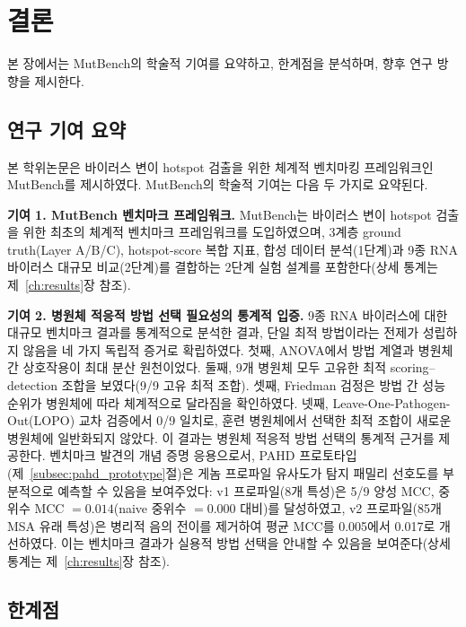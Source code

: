 \chapter{결론}
\label{ch:conclusion}

본 장에서는 MutBench의 학술적 기여를 요약하고, 한계점을 분석하며, 향후 연구 방향을 제시한다.

\section{연구 기여 요약}
\label{sec:contribution_summary}

본 학위논문은 바이러스 변이 hotspot 검출을 위한 체계적 벤치마킹 프레임워크인 MutBench를 제시하였다.
MutBench의 학술적 기여는 다음 두 가지로 요약된다.

\textbf{기여 1. MutBench 벤치마크 프레임워크.}
MutBench는 바이러스 변이 hotspot 검출을 위한 최초의 체계적 벤치마크 프레임워크를 도입하였으며, 3계층 ground truth(Layer A/B/C), hotspot-score 복합 지표, 합성 데이터 분석(1단계)과 9종 RNA 바이러스 대규모 비교(2단계)를 결합하는 2단계 실험 설계를 포함한다(상세 통계는 제~\ref{ch:results}장 참조).

\textbf{기여 2. 병원체 적응적 방법 선택 필요성의 통계적 입증.}
9종 RNA 바이러스에 대한 대규모 벤치마크 결과를 통계적으로 분석한 결과, 단일 최적 방법이라는 전제가 성립하지 않음을 네 가지 독립적 증거로 확립하였다.
첫째, ANOVA에서 방법 계열과 병원체 간 상호작용이 최대 분산 원천이었다.
둘째, 9개 병원체 모두 고유한 최적 scoring--detection 조합을 보였다(9/9 고유 최적 조합).
셋째, Friedman 검정은 방법 간 성능 순위가 병원체에 따라 체계적으로 달라짐을 확인하였다.
넷째, Leave-One-Pathogen-Out(LOPO) 교차 검증에서 0/9 일치로, 훈련 병원체에서 선택한 최적 조합이 새로운 병원체에 일반화되지 않았다.
이 결과는 병원체 적응적 방법 선택의 통계적 근거를 제공한다.
벤치마크 발견의 개념 증명 응용으로서, PAHD 프로토타입(제~\ref{subsec:pahd_prototype}절)은 게놈 프로파일 유사도가 탐지 패밀리 선호도를 부분적으로 예측할 수 있음을 보여주었다: v1 프로파일(8개 특성)은 5/9 양성 MCC, 중위수 MCC $= 0.014$(naive 중위수 $= 0.000$ 대비)를 달성하였고, v2 프로파일(85개 MSA 유래 특성)은 병리적 음의 전이를 제거하여 평균 MCC를 0.005에서 0.017로 개선하였다. 이는 벤치마크 결과가 실용적 방법 선택을 안내할 수 있음을 보여준다(상세 통계는 제~\ref{ch:results}장 참조).

\section{한계점}
\label{sec:limitations}

